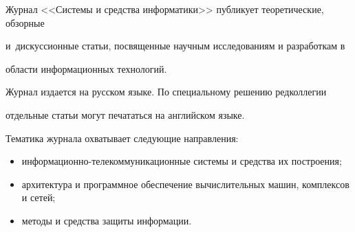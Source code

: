 {\small


{ %

















Журнал <<Системы и средства информатики>> публикует теоретические, обзорные


и~дискуссионные статьи, посвященные научным исследованиям и разработкам в


области информационных технологий.





Журнал издается на русском языке. По специальному решению редколлегии


отдельные статьи могут печататься на английском языке.








Тематика журнала охватывает следующие направления:\\[-10pt]





\begin{itemize}


\item  информационно-телекоммуникационные системы и средства их построения;\\[-14pt]


\item архитектура и  программное обеспечение вычислительных машин, комплексов и сетей;\\[-14pt]


\item методы и средства защиты информации.\\[-14pt]


\end{itemize}





}}
